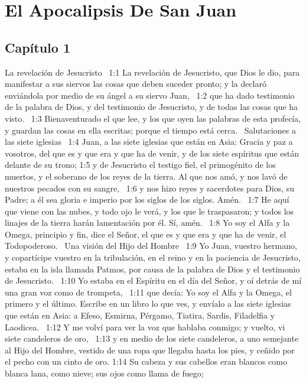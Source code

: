 \chapter{El Apocalipsis De San Juan}


\section*{Capítulo 1}

La revelación de Jesucristo  
1:1 La revelación de Jesucristo, que Dios le dio, para manifestar a sus siervos las cosas que deben suceder pronto; y la declaró enviándola por medio de su ángel a su siervo Juan,  
1:2 que ha dado testimonio de la palabra de Dios, y del testimonio de Jesucristo, y de todas las cosas que ha visto.  
1:3 Bienaventurado el que lee, y los que oyen las palabras de esta profecía, y guardan las cosas en ella escritas; porque el tiempo está cerca.  
Salutaciones a las siete iglesias  
1:4 Juan, a las siete iglesias que están en Asia: Gracia y paz a vosotros, del que es y que era y que ha de venir, y de los siete espíritus que están delante de su trono; 
1:5 y de Jesucristo el testigo fiel, el primogénito de los muertos, y el soberano de los reyes de la tierra. Al que nos amó, y nos lavó de nuestros pecados con su sangre,  
1:6 y nos hizo reyes y sacerdotes para Dios, su Padre; a él sea gloria e imperio por los siglos de los siglos. Amén.  
1:7 He aquí que viene con las nubes, y todo ojo le verá, y los que le traspasaron; y todos los linajes de la tierra harán lamentación por él. Sí, amén.  
1:8 Yo soy el Alfa y la Omega, principio y fin, dice el Señor, el que es y que era y que ha de venir, el Todopoderoso.  
Una visión del Hijo del Hombre  
1:9 Yo Juan, vuestro hermano, y copartícipe vuestro en la tribulación, en el reino y en la paciencia de Jesucristo, estaba en la isla llamada Patmos, por causa de la palabra de Dios y el testimonio de Jesucristo.  
1:10 Yo estaba en el Espíritu en el día del Señor, y oí detrás de mí una gran voz como de trompeta,  
1:11 que decía: Yo soy el Alfa y la Omega, el primero y el último. Escribe en un libro lo que ves, y envíalo a las siete iglesias que están en Asia: a Efeso, Esmirna, Pérgamo, Tiatira, Sardis, Filadelfia y Laodicea.  
1:12 Y me volví para ver la voz que hablaba conmigo; y vuelto, vi siete candeleros de oro,  
1:13 y en medio de los siete candeleros, a uno semejante al Hijo del Hombre, vestido de una ropa que llegaba hasta los pies, y ceñido por el pecho con un cinto de oro. 
1:14 Su cabeza y sus cabellos eran blancos como blanca lana, como nieve; sus ojos como llama de fuego;  
